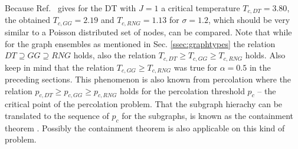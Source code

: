         Because Ref.\ \cite{Janke1994} gives for the DT with \(J=1\) a
        critical temperature \(T_{c,DT} = 3.80\), the obtained \(T_{c,GG} = 2.19\)
        and \(T_{c,RNG} = 1.13\) for \(\sigma = 1.2\), which should be very
        similar to a Poisson distributed set of nodes, can be compared.
        Note that while for the graph ensembles as mentioned in Sec. \ref{ssec:graphtypes}
        the relation \(DT \supseteq GG \supseteq RNG\) holds, also the
        relation \(T_{c,DT} \ge T_{c,GG} \ge T_{c,RNG}\) holds.
        Also keep in mind that the relation \(T_{c,GG} \ge T_{c,RNG}\)
        was true for \(\alpha = 0.5\) in the preceding sections.
        This phenomenon is also known from percolation where the relation
        \(p_{c,DT} \ge p_{c,GG} \ge p_{c,RNG}\) holds for the percolation
        threshold \(p_c\) -- the critical point of the percolation problem.
        That the subgraph hierachy can be translated to
        the sequence of \(p_c\) for the subgraphs, is known as the containment
        theorem \cite{fisher}.
        Possibly the containment theorem is also applicable on this kind of
        problem.

